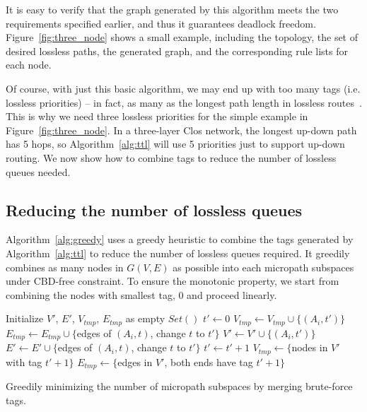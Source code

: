 It is easy to verify that the graph generated by this algorithm meets the two
requirements specified earlier, and thus it guarantees deadlock freedom.
Figure~\ref{fig:three_node} shows a small example, including the topology, the
set of desired lossless paths, the generated graph, and the corresponding rule
lists for each node.

Of course, with just this basic algorithm, we may end up with too many tags
(i.e. lossless priorities) -- in fact, as many as the longest path length in
lossless routes~\cite{xxx}. This is why we need three lossless priorities for
the simple example in Figure~\ref{fig:three_node}. In a three-layer Clos
network, the longest up-down path has 5 hops, so Algorithm~\ref{alg:ttl} will use 5
priorities just to support up-down routing. We now show how to combine tags to
reduce the number of lossless queues needed.

\subsection{Reducing the number of lossless queues}

Algorithm~\ref{alg:greedy} uses a greedy heuristic to combine the tags generated
by Algorithm~\ref{alg:ttl} to reduce the number of lossless queues required.  It
greedily combines as many nodes in $G(V,E)$ as possible into each micropath
subspaces under CBD-free constraint. To ensure the monotonic property, we start
from combining the nodes with smallest tag, 0 and proceed linearly.

\begin{algorithm}[t]
	\small
	Initialize $V'$, $E'$, $V_{tmp}$, $E_{tmp}$ as empty $Set()$\;
	$t' \gets 0$\;
	 {
		 {
			$V_{tmp} \gets V_{tmp} \cup \{(A_i, t')\}$\;
			$E_{tmp} \gets E_{tmp} \cup \{$edges of $(A_i, t)$, change $t$ to $t'\}$\;
			 {
				$V' \gets V' \cup \{(A_i, t')\}$\;
				$E' \gets E' \cup \{$edges of $(A_i, t)$, change $t$ to $t'\}$\;
			}
		}
		 {
			$t' \gets t'+1$\;
			$V_{tmp} \gets \{$nodes in $V'$ with tag $t'+1\}$\;
			$E_{tmp} \gets \{$edges in $V'$, both ends have tag $t'+1\}$\;
		}
	}
	\;
    \caption{Greedily minimizing the number of micropath subspaces by merging brute-force tags.}
	\label{alg:greedy}
\end{algorithm}

